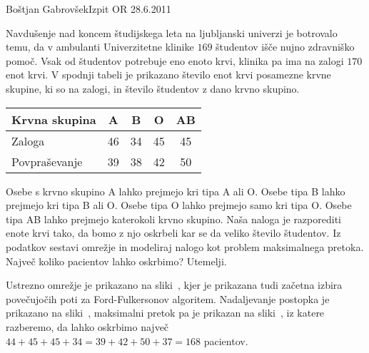 \begin{naloga}{Boštjan Gabrovšek}{Izpit OR 28.6.2011}
\begin{vprasanje}
Navdušenje nad koncem študijskega leta na ljubljanski univerzi
je botrovalo temu,
da v ambulanti Univerzitetne klinike
$169$ študentov išče nujno zdravniško pomoč.
Vsak od študentov potrebuje eno enoto krvi,
klinika pa ima na zalogi $170$ enot krvi.
V spodnji tabeli je prikazano število enot krvi posamezne krvne skupine,
ki so na zalogi,
in število študentov z dano krvno skupino.
\begin{center}
\begin{tabular}{l|cccc}
Krvna skupina &  A &  B &  O & AB \\ \hline
Zaloga        & 46 & 34 & 45 & 45 \\
Povpraševanje & 39 & 38 & 42 & 50
\end{tabular}
\end{center}
Osebe s krvno skupino A lahko prejmejo kri tipa A ali O.
Osebe tipa B lahko prejmejo kri tipa B ali O.
Osebe tipa O lahko prejmejo samo kri tipa O.
Osebe tipa AB lahko prejmejo katerokoli krvno skupino.
Naša naloga je razporediti enote krvi tako,
da bomo z njo oskrbeli kar se da veliko število študentov.
Iz podatkov sestavi omrežje
in modeliraj nalogo kot problem maksimalnega pretoka.
Največ koliko pacientov lahko oskrbimo?
Utemelji.
\end{vprasanje}

\begin{odgovor}
Ustrezno omrežje je prikazano na sliki~,
kjer je prikazana tudi začetna izbira povečujočih poti
za Ford-Fulkersonov algoritem.
Nadaljevanje postopka je prikazano na sliki~,
maksimalni pretok pa je prikazan na sliki~,
iz katere razberemo,
da lahko oskrbimo največ $44+45+45+34 = 39+42+50+37 = 168$ pacientov.

\begin{slika}
\end{slika}
\begin{slika}
\end{slika}
\begin{slika}
\end{slika}
\end{odgovor}
\end{naloga}
